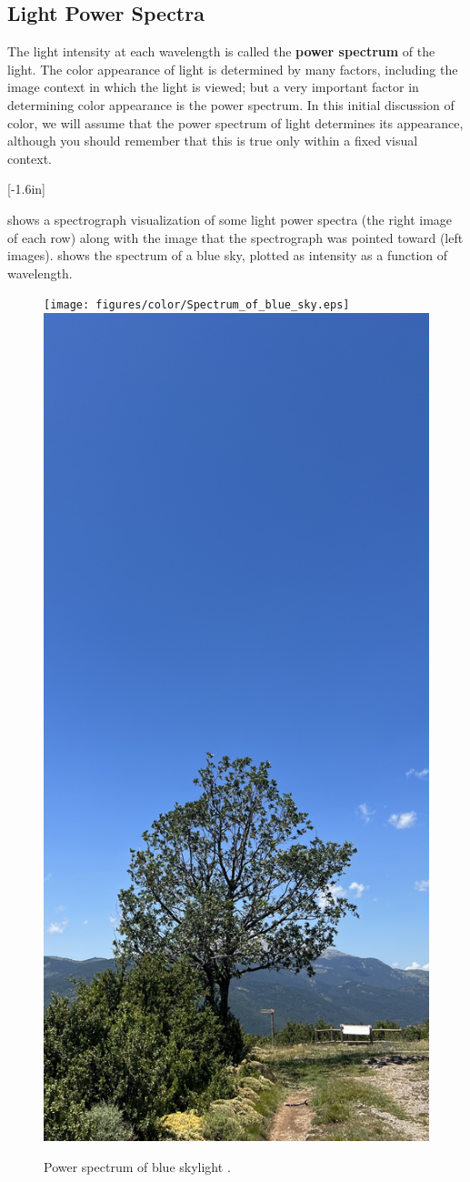 \subsection{Light Power Spectra}

The light intensity at each wavelength is called the {\bf power spectrum} of the
light.  The color appearance of light is determined by many factors, including the image context in which the light is viewed; but a very important factor in determining color appearance is the power spectrum. In this initial discussion of color, we will assume that the power spectrum of light determines its appearance, although you should remember that this is true only within a fixed visual context.

[-1.6in]

\Fig{\ref{fig:examples1}} shows a spectrograph visualization of some light power spectra (the right image of each row) along with the image that the spectrograph was pointed toward (left images).
\Fig{\ref{fig:sources}} shows the spectrum of a blue sky, plotted as 
intensity as a function of wavelength.



\begin{figure}
\centerline{
\texttt{[image: figures/color/Spectrum\_of\_blue\_sky.eps]}
~~~~~
\includegraphics[width=.15\linewidth]{figures/color/IMG_0122.jpg}
}
\caption{Power spectrum of blue skylight \cite{blueskyWiki}.}
\label{fig:sources}
\end{figure}


